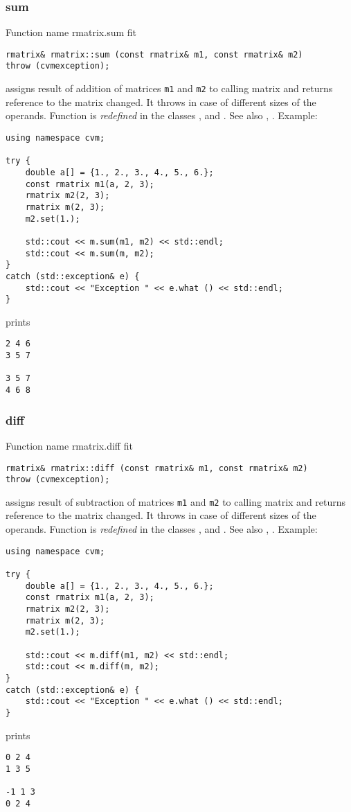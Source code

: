 \subsubsection{sum}
Function%
\pdfdest name {rmatrix.sum} fit
\begin{verbatim}
rmatrix& rmatrix::sum (const rmatrix& m1, const rmatrix& m2)
throw (cvmexception);
\end{verbatim}
assigns  result of addition of
matrices \verb"m1" and \verb"m2"  to  calling matrix
and returns  reference to
the matrix changed.
It throws  
in case of different sizes of the operands.
Function is \emph{redefined} in the classes
, 
and .
See also ,
.
Example:
\begin{Verbatim}
using namespace cvm;

try {
    double a[] = {1., 2., 3., 4., 5., 6.};
    const rmatrix m1(a, 2, 3);
    rmatrix m2(2, 3);
    rmatrix m(2, 3);
    m2.set(1.);

    std::cout << m.sum(m1, m2) << std::endl;
    std::cout << m.sum(m, m2);
}
catch (std::exception& e) {
    std::cout << "Exception " << e.what () << std::endl;
}
\end{Verbatim}
prints
\begin{Verbatim}
2 4 6
3 5 7

3 5 7
4 6 8
\end{Verbatim}
\newpage



\subsubsection{diff}
Function%
\pdfdest name {rmatrix.diff} fit
\begin{verbatim}
rmatrix& rmatrix::diff (const rmatrix& m1, const rmatrix& m2)
throw (cvmexception);
\end{verbatim}
assigns  result of subtraction of
matrices \verb"m1" and \verb"m2" to  calling matrix
and returns  reference to
the matrix changed.
It throws  
in case of different sizes of the operands.
Function is \emph{redefined} in the classes
, 
and .
See also ,
.
Example:
\begin{Verbatim}
using namespace cvm;

try {
    double a[] = {1., 2., 3., 4., 5., 6.};
    const rmatrix m1(a, 2, 3);
    rmatrix m2(2, 3);
    rmatrix m(2, 3);
    m2.set(1.);

    std::cout << m.diff(m1, m2) << std::endl;
    std::cout << m.diff(m, m2);
}
catch (std::exception& e) {
    std::cout << "Exception " << e.what () << std::endl;
}
\end{Verbatim}
prints
\begin{Verbatim}
0 2 4
1 3 5

-1 1 3
0 2 4
\end{Verbatim}
\newpage



